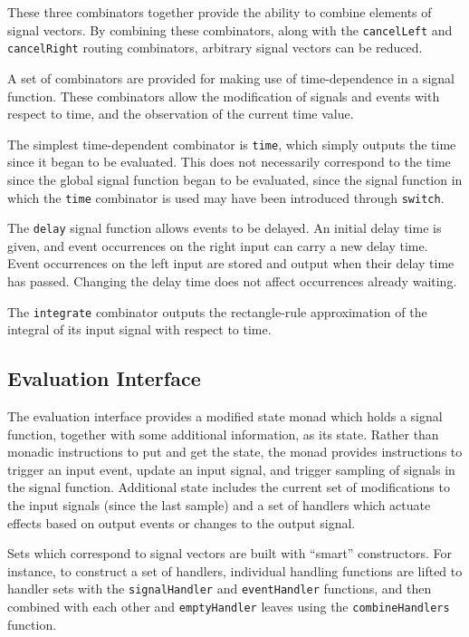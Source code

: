 These three combinators together provide the ability to combine elements of
signal vectors. By combining these combinators, along with the {\tt cancelLeft}
and {\tt cancelRight} routing combinators, arbitrary signal vectors can be
reduced.

A set of combinators are provided for making use of time-dependence in a signal
function. These combinators allow the modification of signals and events with
respect to time, and the observation of the current time value.

The simplest time-dependent combinator is {\tt time}, which simply outputs
the time since it began to be evaluated. This does not necessarily correspond to
the time since the global signal function began to be evaluated, since the
signal function in which the {\tt time} combinator is used may have been
introduced through {\tt switch}.

The {\tt delay} signal function allows events to be delayed. An initial delay
time is given, and event occurrences on the right input can carry a new delay
time. Event occurrences on the left input are stored and output when their delay
time has passed. Changing the delay time does not affect occurrences already
waiting.

The {\tt integrate} combinator outputs the rectangle-rule approximation of the
integral of its input signal with respect to time.

\subsection{Evaluation Interface}
\label{subsection:System_Design_and_Interface-Evaluation_Interface}

The evaluation interface provides a modified state monad which holds a signal
function, together with some additional information, as its state.
Rather than monadic instructions to put and get the state, the monad provides instructions
to trigger an input event, update an input signal, and trigger sampling of
signals in the signal function. Additional state includes the current set of
modifications to the input signals (since the last sample) and a set of
handlers which actuate effects based on output events or changes to the output
signal.

Sets which correspond to signal vectors are built with ``smart'' constructors.
For instance, to construct a set of handlers, individual handling functions are
lifted to handler sets with the {\tt signalHandler} and {\tt eventHandler}
functions, and then combined with each other and {\tt emptyHandler} leaves
using the {\tt combineHandlers} function.

